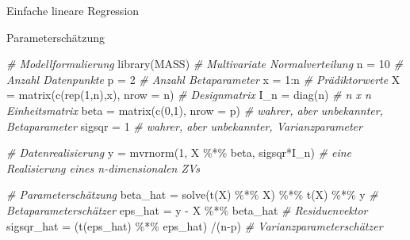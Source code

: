 \documentclass[
  8pt,
  ignorenonframetext,
]{beamer}
\newenvironment{Shaded}{\begin{snugshade}}{\end{snugshade}}
\newcommand{\AttributeTok}[1]{\textcolor[rgb]{0.77,0.63,0.00}{#1}}
\newcommand{\CommentTok}[1]{\textcolor[rgb]{0.56,0.35,0.01}{\textit{#1}}}
\newcommand{\DecValTok}[1]{\textcolor[rgb]{0.00,0.00,0.81}{#1}}
\newcommand{\FunctionTok}[1]{\textcolor[rgb]{0.00,0.00,0.00}{#1}}
\newcommand{\NormalTok}[1]{#1}
\newcommand{\OtherTok}[1]{\textcolor[rgb]{0.56,0.35,0.01}{#1}}
\newcommand{\SpecialCharTok}[1]{\textcolor[rgb]{0.00,0.00,0.00}{#1}}
\begin{document}
\begin{frame}[fragile]{Einfache lineare Regression}
\protect\hypertarget{einfache-lineare-regression-7}{}
\vspace{1mm}

Parameterschätzung \vspace{2mm}  \tiny

\begin{Shaded}
\begin{Highlighting}[]
\CommentTok{\# Modellformulierung}
\FunctionTok{library}\NormalTok{(MASS)                                    }\CommentTok{\# Multivariate Normalverteilung}
\NormalTok{n          }\OtherTok{=} \DecValTok{10}                                  \CommentTok{\# Anzahl Datenpunkte}
\NormalTok{p          }\OtherTok{=} \DecValTok{2}                                   \CommentTok{\# Anzahl Betaparameter}
\NormalTok{x          }\OtherTok{=} \DecValTok{1}\SpecialCharTok{:}\NormalTok{n                                 }\CommentTok{\# Prädiktorwerte}
\NormalTok{X          }\OtherTok{=} \FunctionTok{matrix}\NormalTok{(}\FunctionTok{c}\NormalTok{(}\FunctionTok{rep}\NormalTok{(}\DecValTok{1}\NormalTok{,n),x), }\AttributeTok{nrow =}\NormalTok{ n)     }\CommentTok{\# Designmatrix}
\NormalTok{I\_n        }\OtherTok{=} \FunctionTok{diag}\NormalTok{(n)                             }\CommentTok{\# n x n Einheitsmatrix}
\NormalTok{beta       }\OtherTok{=} \FunctionTok{matrix}\NormalTok{(}\FunctionTok{c}\NormalTok{(}\DecValTok{0}\NormalTok{,}\DecValTok{1}\NormalTok{), }\AttributeTok{nrow =}\NormalTok{ p)            }\CommentTok{\# wahrer, aber unbekannter, Betaparameter}
\NormalTok{sigsqr     }\OtherTok{=} \DecValTok{1}                                   \CommentTok{\# wahrer, aber unbekannter, Varianzparameter}

\CommentTok{\# Datenrealisierung}
\NormalTok{y          }\OtherTok{=} \FunctionTok{mvrnorm}\NormalTok{(}\DecValTok{1}\NormalTok{, X }\SpecialCharTok{\%*\%}\NormalTok{ beta, sigsqr}\SpecialCharTok{*}\NormalTok{I\_n)  }\CommentTok{\# eine Realisierung eines n{-}dimensionalen ZVs}

\CommentTok{\# Parameterschätzung}
\NormalTok{beta\_hat   }\OtherTok{=} \FunctionTok{solve}\NormalTok{(}\FunctionTok{t}\NormalTok{(X) }\SpecialCharTok{\%*\%}\NormalTok{ X) }\SpecialCharTok{\%*\%} \FunctionTok{t}\NormalTok{(X) }\SpecialCharTok{\%*\%}\NormalTok{ y    }\CommentTok{\# Betaparameterschätzer}
\NormalTok{eps\_hat    }\OtherTok{=}\NormalTok{ y }\SpecialCharTok{{-}}\NormalTok{ X }\SpecialCharTok{\%*\%}\NormalTok{ beta\_hat                  }\CommentTok{\# Residuenvektor}
\NormalTok{sigsqr\_hat }\OtherTok{=}\NormalTok{ (}\FunctionTok{t}\NormalTok{(eps\_hat) }\SpecialCharTok{\%*\%}\NormalTok{ eps\_hat) }\SpecialCharTok{/}\NormalTok{(n}\SpecialCharTok{{-}}\NormalTok{p)     }\CommentTok{\# Varianzparameterschätzer}


\end{Highlighting}
\end{Shaded}
\end{frame}
\end{document}
